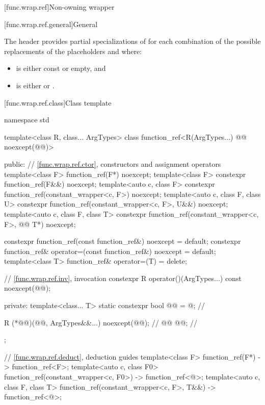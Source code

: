 [func.wrap.ref]{Non-owning wrapper}

[func.wrap.ref.general]{General}

\pnum
The header provides partial specializations of  for each combination of the possible replacements of the placeholders \cv{} and  where:
\begin{itemize}
\item \cv{} is either const or empty, and
\item {} is either  or .
\end{itemize}

[func.wrap.ref.class]{Class template }

\begin{codeblock}
namespace std {
  template<class R, class... ArgTypes>
  class function_ref<R(ArgTypes...) @\cv{}@ noexcept(@@)> {
  public:
    // \ref{func.wrap.ref.ctor}, constructors and assignment operators
    template<class F> function_ref(F*) noexcept;
    template<class F> constexpr function_ref(F&&) noexcept;
    template<auto c, class F> constexpr function_ref(constant_wrapper<c, F>) noexcept;
    template<auto c, class F, class U>
      constexpr function_ref(constant_wrapper<c, F>, U&&) noexcept;
    template<auto c, class F, class T>
      constexpr function_ref(constant_wrapper<c, F>, @\cv{}@ T*) noexcept;

    constexpr function_ref(const function_ref&) noexcept = default;
    constexpr function_ref& operator=(const function_ref&) noexcept = default;
    template<class T> function_ref& operator=(T) = delete;

    // \ref{func.wrap.ref.inv}, invocation
    constexpr R operator()(ArgTypes...) const noexcept(@@);

  private:
    template<class... T>
      static constexpr bool @@ = @\seebelownc@;             // \expos

    R (*@@)(@@, ArgTypes&&...) noexcept(@@);      // \expos
    @@ @@;                                       // \expos
  };

  // \ref{func.wrap.ref.deduct}, deduction guides
  template<class F>
    function_ref(F*) -> function_ref<F>;
  template<auto c, class F0>
    function_ref(constant_wrapper<c, F0>) -> function_ref<@\seebelow@>;
  template<auto c, class F, class T>
    function_ref(constant_wrapper<c, F>, T&&) -> function_ref<@\seebelow@>;
}
\end{codeblock}

